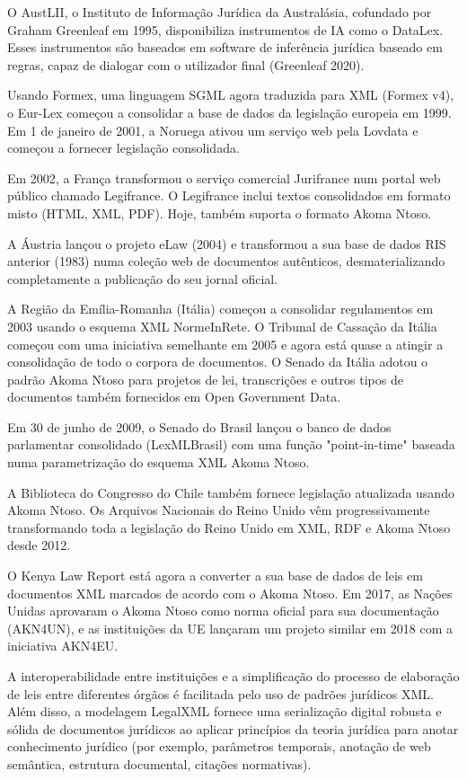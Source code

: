 O AustLII, o Instituto de Informação Jurídica da Australásia, cofundado por Graham Greenleaf em 1995, disponibiliza instrumentos 
de IA como o DataLex. Esses instrumentos são baseados em software de inferência jurídica baseado em regras, capaz de dialogar 
com o utilizador final (Greenleaf 2020).

Usando Formex, uma linguagem SGML agora traduzida para XML (Formex v4), o Eur-Lex começou a consolidar a base de dados da 
legislação europeia em 1999. 
Em 1 de janeiro de 2001, a Noruega ativou um serviço web pela Lovdata e começou a fornecer legislação consolidada. 

Em 2002, a França transformou o serviço comercial Jurifrance num portal web público chamado Legifrance. 
O Legifrance inclui textos consolidados em formato misto (HTML, XML, PDF). Hoje, também suporta o formato Akoma Ntoso.

A Áustria lançou o projeto eLaw (2004) e transformou a sua base de dados RIS anterior (1983) numa coleção web de documentos 
autênticos, desmaterializando completamente a publicação do seu jornal oficial. 

A Região da Emília-Romanha (Itália) começou a consolidar regulamentos em 2003 usando o esquema XML NormeInRete. 
O Tribunal de Cassação da Itália começou com uma iniciativa semelhante em 2005 e agora está 
quase a atingir a consolidação de todo o corpora de documentos. 
O Senado da Itália adotou o padrão Akoma Ntoso para projetos de lei, transcrições e outros tipos de documentos também 
fornecidos em Open Government Data.

Em 30 de junho de 2009, o Senado do Brasil lançou o banco de dados parlamentar consolidado (LexMLBrasil) com uma função 
"point-in-time" baseada numa parametrização do esquema XML Akoma Ntoso. 

A Biblioteca do Congresso do Chile também fornece legislação atualizada usando Akoma Ntoso. 
Os Arquivos Nacionais do Reino Unido vêm progressivamente transformando toda a legislação do Reino Unido em XML, RDF e 
Akoma Ntoso desde 2012. 

O Kenya Law Report está agora a converter a sua base de dados de leis em documentos XML marcados de acordo com o Akoma Ntoso. 
Em 2017, as Nações Unidas aprovaram o Akoma Ntoso como norma oficial para sua documentação (AKN4UN), e as instituições da UE 
lançaram um projeto similar em 2018 com a iniciativa AKN4EU.

A interoperabilidade entre instituições e a simplificação do processo de elaboração de leis entre diferentes órgãos é facilitada 
pelo uso de padrões jurídicos XML. 
Além disso, a modelagem LegalXML fornece uma serialização digital robusta e sólida de documentos jurídicos ao aplicar 
princípios da teoria jurídica para anotar conhecimento jurídico (por exemplo, parâmetros temporais, anotação de web semântica, 
estrutura documental, citações normativas).

